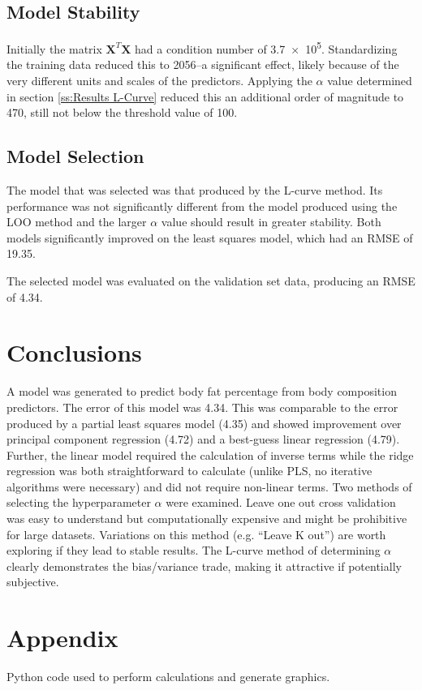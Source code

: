 \documentclass{IEEEtran}
\begin{document}

\subsection{Model Stability}
Initially the matrix $\mathbf{X}^T \mathbf{X}$ had a condition number of \num{3.7e5}. Standardizing the training 
data reduced this to \num{2056}--a significant effect, likely because of the very different units and scales of 
the predictors. Applying the $\alpha$ value determined in section \ref{ss:Results L-Curve} reduced this an 
additional order of magnitude to \num{470}, still not below the threshold value of \num{100}.

\subsection{Model Selection}
The model that was selected was that produced by the L-curve method. Its performance was not significantly 
different from the model produced using the LOO method and the larger $\alpha$ value should result in greater 
stability. Both models significantly improved on the least squares model, which had an RMSE of \num{19.35}.

The selected model was evaluated on the validation set data, producing an RMSE of \num{4.34}.

\section{Conclusions}

A model was generated to predict body fat percentage from body composition predictors. The error of this model was \num{4.34}. This was comparable to the error produced by a partial least squares model (\num{4.35}) and showed improvement over principal component regression (\num{4.72}) and a best-guess linear regression (\num{4.79}). Further, the linear model required the calculation of inverse terms while the ridge regression was both straightforward to calculate (unlike PLS, no iterative algorithms were necessary) and did not require non-linear terms. Two methods of selecting the hyperparameter $\alpha$ were examined. Leave one out cross validation was easy to understand but computationally expensive and might be prohibitive for large datasets. Variations on this method (e.g. ``Leave K out'') are worth exploring if they lead to stable results. The L-curve method of determining $\alpha$ clearly demonstrates the bias/variance trade, making it attractive if potentially subjective. 

\printbibliography

\onecolumn
\section{Appendix}
Python code used to perform calculations and generate graphics.
\lstset{frame=single}

\end{document}
